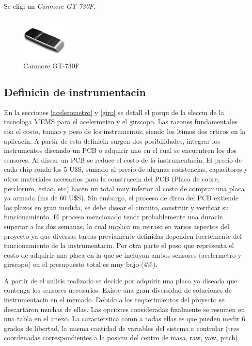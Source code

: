 \documentclass[spanish,12pt,a4paper,titlepage]{report}
\begin{document}
Se eligi un \textit{Canmore GT-730F}.

\begin{figure}[h!]
	\centering
	\includegraphics[width=0.2\textwidth]{./pics_comparacion_hardware/gps.jpg}
	\caption{Canmore GT-730F}
	\label{fig:gps}
\end{figure}

\newpage
\subsection{Definicin de instrumentacin}
\vspace*{15pt}


En la secciones \ref{acelerometro} y \ref{giro} se detall el porqu de la eleccin de la tecnologa MEMS para el acelermetro y el girscopo. Las razones fundamentales son el costo, tamao y peso de los instrumentos, siendo los ltimos dos crticos en la aplicacin.
A partir de esta definicin surgen dos posibilidades, integrar los instrumentos diseando un PCB o adquirir uno en el cual se encuentren los dos sensores. Al disear un PCB se reduce el costo de la instrumentacin. El precio de cada chip ronda los 5 U\$S, sumado al precio de algunas resistencias, capacitores y otros materiales necesarios para la construccin del PCB (Placa de cobre, percloruro, estao, etc) hacen un total muy inferior al costo de comprar una placa ya armada (ms de 60 U\$S). Sin embargo, el proceso de diseo del PCB extiende los plazos en gran medida, se debe disear el circuito, construir y verificar su funcionamiento. El proceso mencionado tendr probablemente una duracin superior a las dos semanas, lo cual implica un retraso en varios aspectos del proyecto ya que diversas tareas previamente definidas dependen fuertemente del funcionamiento de la instrumentacin. Por otra parte el peso que representa el costo de adquirir una placa en la que se incluyan ambos sensores (acelermetro y girscopo) en el presupuesto total es muy bajo (4\%).

A partir de el anlisis realizado se decide por adquirir una placa ya diseada que contenga los sensores necesarios. Existe una gran diversidad de soluciones de instrumentacin en el mercado. Debido a los requerimientos del proyecto se descartaron muchas de ellas. Las opciones consideradas finalmente se resumen en una tabla en el anexo. La caracterstica comn a todas ellas es que pueden medir 6 grados de libertad, la misma cantidad de variables del sistema a controlar (tres coordenadas correspondientes a la posicin del centro de masa, raw, yaw, pitch) %
\end{document}
